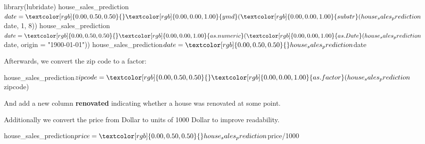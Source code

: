 \documentclass[
  11pt,
  parskip=half,
  DIV=calc,
  BCOR=10mm,
  x11names]{scrbook}
\newenvironment{Shaded}{}{}
\newcommand{\CommentTok}[1]{\textcolor[rgb]{0.00,0.50,0.00}{#1}}
\newcommand{\DataTypeTok}[1]{#1}
\newcommand{\DecValTok}[1]{#1}
\newcommand{\KeywordTok}[1]{\textcolor[rgb]{0.00,0.00,1.00}{#1}}
\newcommand{\NormalTok}[1]{#1}
\newcommand{\OperatorTok}[1]{#1}
\newcommand{\OtherTok}[1]{\textcolor[rgb]{1.00,0.25,0.00}{#1}}
\newcommand{\StringTok}[1]{\textcolor[rgb]{0.00,0.50,0.50}{#1}}
\begin{document}
\begin{Shaded}
\begin{Highlighting}[]
\KeywordTok{library}\NormalTok{(lubridate)}
\NormalTok{house_sales_prediction}\OperatorTok{$}\NormalTok{date =}\StringTok{ }\KeywordTok{ymd}\NormalTok{(}\KeywordTok{substr}\NormalTok{(house_sales_prediction}\OperatorTok{$}\NormalTok{date, }
  \DecValTok{1}\NormalTok{, }\DecValTok{8}\NormalTok{))}
\NormalTok{house_sales_prediction}\OperatorTok{$}\NormalTok{date =}\StringTok{ }\KeywordTok{as.numeric}\NormalTok{(}\KeywordTok{as.Date}\NormalTok{(house_sales_prediction}\OperatorTok{$}\NormalTok{date, }
  \DataTypeTok{origin =} \StringTok{"1900-01-01"}\NormalTok{))}
\NormalTok{house_sales_prediction}\OperatorTok{$}\NormalTok{date =}\StringTok{ }\NormalTok{house_sales_prediction}\OperatorTok{$}\NormalTok{date}
\end{Highlighting}
\end{Shaded}

Afterwards, we convert the zip code to a factor:

\begin{Shaded}
\begin{Highlighting}[]
\NormalTok{house_sales_prediction}\OperatorTok{$}\NormalTok{zipcode =}\StringTok{ }\KeywordTok{as.factor}\NormalTok{(house_sales_prediction}\OperatorTok{$}\NormalTok{zipcode)}
\end{Highlighting}
\end{Shaded}

And add a new column \textbf{renovated} indicating whether a house was renovated at some point.

\begin{Shaded}
\end{Shaded}

Additionally we convert the price from Dollar to units of 1000 Dollar to improve readability.

\begin{Shaded}
\begin{Highlighting}[]
\NormalTok{house_sales_prediction}\OperatorTok{$}\NormalTok{price =}\StringTok{ }\NormalTok{house_sales_prediction}\OperatorTok{$}\NormalTok{price}\OperatorTok{/}\DecValTok{1000}
\end{Highlighting}
\end{Shaded}
\end{document}
